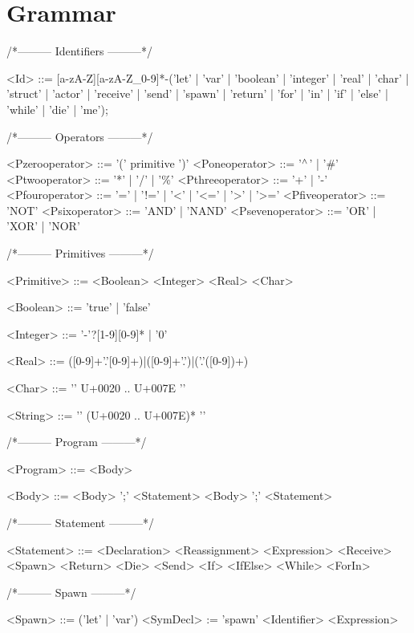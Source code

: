 \section{Grammar}
\setlength{\grammarindent}{100pt}
/*--------- Identifiers ---------*/
\begin{grammar}
<Id> ::= [a-zA-Z][a-zA-Z\_0-9]*-('let' | 'var' | 'boolean' | 'integer' | 'real' | 'char' | 'struct' | 'actor' | 'receive' | 'send' | 'spawn' | 'return' | 'for' | 'in' | 'if' | 'else' | 'while' | 'die' | 'me');
\end{grammar}
/*--------- Operators ---------*/
\begin{grammar}
<Pzerooperator> ::= '(' primitive ')'
<Poneoperator> ::= '$^\wedge{}$' | '\#'
<Ptwooperator> ::= '*' | '/' | '\%'
<Pthreeoperator> ::= '+' | '-'
<Pfouroperator> ::= '=' | '!=' | '<' | '<=' | '>' | '>='
<Pfiveoperator> ::= 'NOT'
<Psixoperator> ::= 'AND' | 'NAND'
<Psevenoperator> ::= 'OR' | 'XOR' | 'NOR'
\end{grammar}
/*--------- Primitives ---------*/
\begin{grammar}

<Primitive> ::= <Boolean>
\alt <Integer>
\alt <Real>
\alt <Char>

<Boolean> ::= 'true' | 'false'

<Integer> ::= '-'?[1-9][0-9]* | '0'

<Real> ::= ([0-9]+'.'[0-9]+)|([0-9]+'.')|('.'([0-9])+)

<Char> ::= '\textquotesingle' U+0020 .. U+007E '\textquotesingle'

<String> ::= '\textquotedbl' (U+0020 .. U+007E)* '\textquotedbl'


\end{grammar}
/*--------- Program ---------*/
\begin{grammar}
<Program> ::= <Body>

<Body> ::= <Body> ';' <Statement>
 \alt <Body> ';'
 \alt <Statement>

\end{grammar}
/*--------- Statement ---------*/
\begin{grammar}
<Statement> ::= <Declaration>
 \alt <Reassignment>
 \alt <Expression>
 \alt <Receive>
 \alt <Spawn>
 \alt <Return>
 \alt <Die>
 \alt <Send>
 \alt <If>
 \alt <IfElse>
 \alt <While>
 \alt <ForIn>

\end{grammar}
/*--------- Spawn ---------*/
\begin{grammar}
<Spawn> ::= ('let' | 'var') <SymDecl> := 'spawn' <Identifier> <Expression>

\end{grammar}
